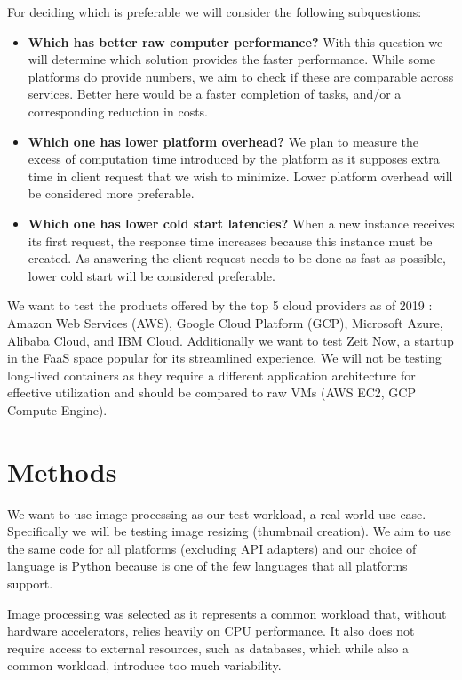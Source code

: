 \documentclass[11pt]{article}
\begin{document}
For deciding which is preferable we will consider the following subquestions:

\begin{itemize}
\item \textbf{Which has better raw computer performance?} With this question we will determine which solution provides the faster performance. While some platforms do provide numbers, we aim to check if these are comparable across services. Better here would be a faster completion of tasks, and/or a corresponding reduction in costs.

\item \textbf{Which one has lower platform overhead?}  We plan to measure the excess of computation time introduced by the platform as it supposes extra time in client request that we wish to minimize. Lower platform overhead will be considered more preferable.

\item \textbf{Which one has lower cold start latencies?} When a new instance receives its first request, the response time increases because this instance must be created. As answering the client request needs to be done as fast as possible, lower cold start will be considered preferable. 
\end{itemize}


We want to test the products offered by the top 5 cloud providers as of 2019 \cite{hh}: Amazon Web Services (AWS), Google Cloud Platform (GCP), Microsoft Azure, Alibaba Cloud, and IBM Cloud. Additionally we want to test Zeit Now, a startup in the FaaS space popular for its streamlined experience. We will not be testing long-lived containers as they require a different application architecture for effective utilization and should be compared to raw VMs (AWS EC2, GCP Compute Engine).


\section{Methods}
\label{methods}
We want to use image processing as our test workload, a real world \cite{ii} use case. Specifically we will be testing image resizing (thumbnail creation). We aim to use the same code for all platforms (excluding API adapters) and our choice of language is Python because is one of the few languages that all platforms support.

Image processing was selected as it represents a common workload that, without hardware accelerators, relies heavily on CPU performance. It also does not require access to external resources, such as databases, which while also a common workload, introduce too much variability.
\end{document}
